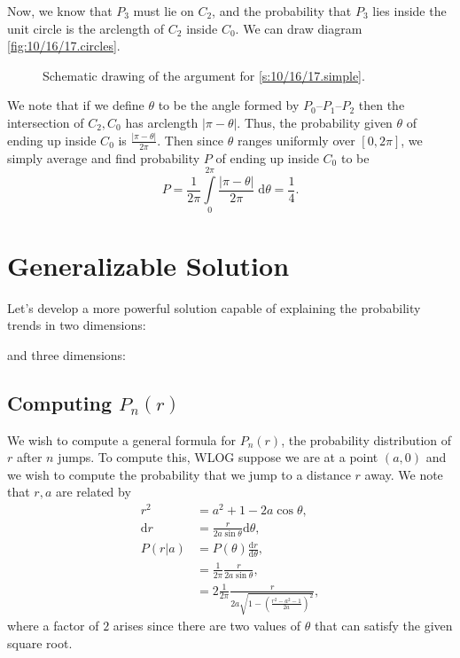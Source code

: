 \documentclass[12pt]{report}
\newcommand{\rd}[2]{\frac{\mathrm{d}#1}{\mathrm{d}#2}}
\newcommand{\abs}[1]{\left|#1\right|}
\begin{document}
Now, we know that $P_3$ must lie on $C_2$, and the
probability that $P_3$ lies inside the unit circle is the arclength of $C_2$
inside $C_0$. We can draw diagram \autoref{fig:10/16/17.circles}.
\begin{figure}[!h]
    \centering
    \caption{Schematic drawing of the argument for \autoref{s:10/16/17.simple}.}
\end{figure}\label{fig:10/16/17.circles}

We note that if we define $\theta$ to be the angle formed by $P_0$--$P_1$--$P_2$
then the intersection of $C_2, C_0$ has arclength $\abs{\pi - \theta}$. Thus,
the probability given $\theta$ of ending up inside $C_0$ is $\frac{\abs{\pi -
\theta}}{2\pi}$. Then since $\theta$ ranges uniformly over $[0, 2\pi]$, we
simply average and find probability $P$ of ending up inside $C_0$ to be
\begin{equation}
    P = \frac{1}{2\pi}\int\limits_{0}^{2\pi}\frac{\abs{\pi - \theta}}{2\pi}
        \;\mathrm{d}\theta
        = \frac{1}{4}.
\end{equation}

\section{Generalizable Solution}

Let's develop a more powerful solution capable of explaining the probability
trends in two dimensions:

and three dimensions:


\subsection{Computing $P_n(r)$}

We wish to compute a general formula for $P_n(r)$, the probability distribution
of $r$ after $n$ jumps. To compute this, WLOG suppose we are at a point $(a, 0)$
and we wish to compute the probability that we jump to a distance $r$ away. We
note that $r, a$ are related by
\begin{align}
    r^2 &= a^2 + 1 - 2a\cos\theta,\\
    \mathrm{d}r &= \frac{r}{2a\sin\theta}\mathrm{d}\theta,\\
    P(r|a) &= P(\theta)\rd{r}{\theta},\nonumber\\
        &= \frac{1}{2\pi} \frac{r}{2a\sin\theta},\nonumber\\
        & = 2\frac{1}{2\pi}\frac{r}{2a\sqrt{1 - \left(
            \frac{r^2 - a^2 - 1}{2a}
        \right)^2}},\label{eq:10/16/17.sol}
\end{align}
where a factor of $2$ arises since there are two values of $\theta$ that can
satisfy the given square root.
\end{document}
